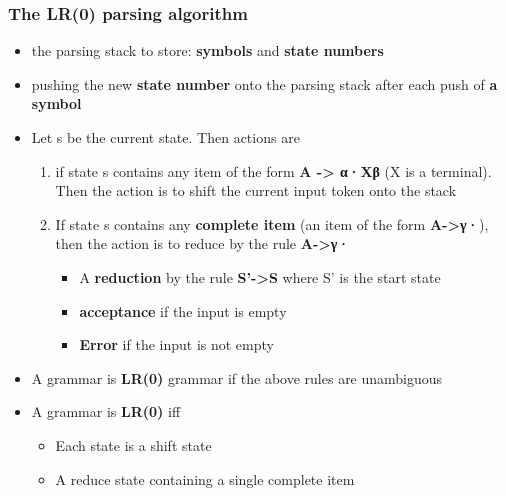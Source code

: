 \documentclass[11pt]{article}
\begin{document}
\subsubsection{The LR(0) parsing algorithm}
\label{sec:orgae19f64}
\begin{itemize}
\item the parsing stack to store: \textbf{symbols} and \textbf{state numbers}
\item pushing the new \textbf{state number} onto the parsing stack after each push of \textbf{a
symbol}
\item Let s be the current state. Then actions are
\begin{enumerate}
\item if state s contains any item of the form \textbf{A -> α·Xβ} (X is a terminal).
Then the action is to shift the current input token onto the stack
\item If state s contains any \textbf{complete item} (an item of the form \textbf{A->γ·}),
then the action is to reduce by the rule \textbf{A->γ·}
\begin{itemize}
\item A \textbf{reduction} by the rule \textbf{S'->S} where S' is the start state
\item \textbf{acceptance} if the input is empty
\item \textbf{Error} if the input is not empty
\end{itemize}
\end{enumerate}
\item A grammar is \textbf{LR(0)} grammar if the above rules are unambiguous
\item A grammar is \textbf{LR(0)} iff
\begin{itemize}
\item Each state is a shift state
\item A reduce state containing a single complete item
\end{itemize}
\end{itemize}
\end{document}
